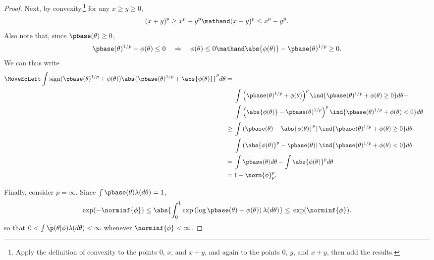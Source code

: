 \begin{lem}
\begin{proof}
Next, by convexity,\footnote{Apply the definition of convexity to the points
$0$, $x$, and $x + y$, and again to the points $0$, $y$, and $x+y$, then add the
results.} for any $x \ge y \ge 0$,
%
\begin{align*}
%
(x + y)^p \ge{} x^p + y^p \mathand
(x - y)^p \le{} x^p - y^p.
%
\end{align*}
%
Also note that, since $\pbase(\theta) \ge 0$,
%
\begin{align*}
%
\pbase(\theta)^{1/p} + \phi(\theta) \le 0
\quad\Rightarrow\quad
\phi(\theta) \le 0 \mathand
\abs{\phi(\theta)} - \pbase(\theta)^{1/p} \ge 0.
%
\end{align*}
%
We can thus write
%
\begin{align*}
%
\MoveEqLeft
\int \mathrm{sign}(\pbase(\theta)^{1/p} + \phi(\theta))
    \abs{\pbase(\theta)^{1/p} + \abs{\phi(\theta)}}^{p} d\theta
={}\\&
    \int \left(\pbase(\theta)^{1/p} + \phi(\theta)\right)^{p}
        \ind{\pbase(\theta)^{1/p} + \phi(\theta) \ge 0}
        d\theta - \\&
    \int \left(\abs{\phi(\theta)} - \pbase(\theta)^{1/p}\right)^{p}
        \ind{\pbase(\theta)^{1/p} + \phi(\theta) < 0}
        d\theta
\\\ge{}&
    \int \left(\pbase(\theta) - \abs{\phi(\theta)}^{p}\right)
        \ind{\pbase(\theta)^{1/p} + \phi(\theta) \ge 0}
        d\theta - \\&
    \int \left(\abs{\phi(\theta)}^p - \pbase(\theta)\right)
        \ind{\pbase(\theta)^{1/p} + \phi(\theta) < 0}
        d\theta
\\={}&
    \int \pbase(\theta) d\theta - \int \abs{\phi(\theta)}^p d\theta
\\={}&
    1 - \norm{\phi}_p^p.
%
\end{align*}

Finally, consider $p = \infty$.  Since $\int \pbase(\theta) \lambda(d\theta) =
1$,
%
\begin{align*}
%
\exp(-\norminf{\phi}) \le{}
\abs{\int_0^1 \exp\left(\log \pbase(\theta) + \phi(\theta)\right) \lambda(d\theta)}
\le{}
\exp(\norminf{\phi}).
%
\end{align*}
%
so that $0 < \int \tilde{\p}(\theta \vert \phi) \lambda(d\theta) < \infty$
whenever $\norminf{\phi} < \infty$.
%
\end{proof}
%
\end{lem}



